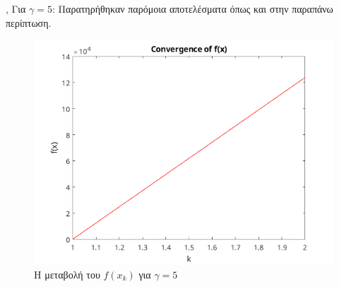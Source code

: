 \sep
Για $\gamma = 5$:\newline
Παρατηρήθηκαν παρόμοια αποτελέσματα όπως και στην παραπάνω περίπτωση.
\begin{figure}[ht]
    \centering
    \includegraphics[width=0.7\linewidth]{Figs/conv_1_5.png}
    \caption{Η μεταβολή του $f(x_k)$ για $\gamma = 5$}
    \label{fig:1_5}
\end{figure}
